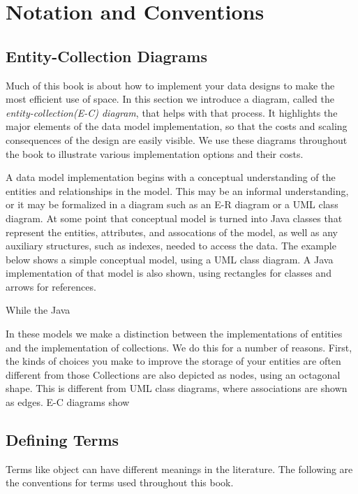\section{Notation and Conventions}

\subsection{Entity-Collection Diagrams}

Much of this book is about how to implement your data designs to make the most efficient use of space. In this section we introduce a diagram, called the \emph{entity-collection(E-C) diagram}, that helps with that process. It highlights the major elements of the data model implementation, so that the costs and scaling consequences of the design are easily visible. We use these diagrams throughout the book to illustrate various implementation options and their costs.

A data model implementation begins with a conceptual understanding of the entities and relationships in the model.  This may be an informal understanding, or it may be formalized in a diagram such as an E-R diagram or a UML class diagram.  At some point that conceptual model is turned into Java classes that represent the entities, attributes, and assocations of the model, as well as any auxiliary structures, such as indexes, needed to access the data.  The example below shows a simple conceptual model, using a UML class diagram.  A Java implementation of that model is also shown, using rectangles for classes and arrows for references.  %

While the Java 


In these models we make a distinction between the implementations of entities and the implementation of collections.  We do this for a number of reasons.  First, the kinds of choices you make to improve the storage of your entities are often different from those Collections are also depicted as nodes, using an octagonal shape.  This is different from UML class diagrams, where associations are shown as edges. E-C diagrams show 

\subsection{Defining Terms}

Terms like object can have different meanings in the literature.  The following are the conventions for terms used throughout this book.

